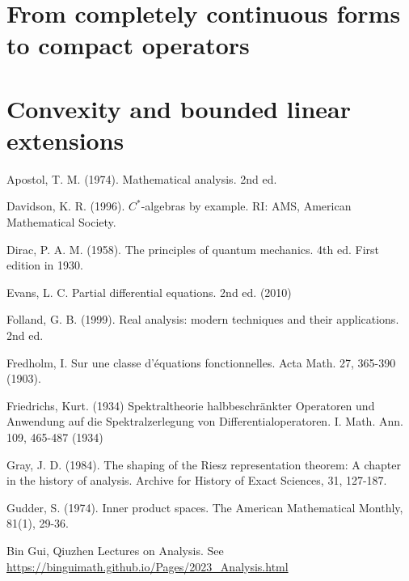 \documentclass[12pt,b5paper,notitlepage]{article}
\theoremstyle{definition}
\theoremstyle{plain}
\numberwithin{equation}{section}
\begin{document}
\section{From completely continuous forms to compact operators}\label{lb355}


\newpage

\section{Convexity and bounded linear extensions}





\printindex	






	\begin{thebibliography}{999999}
		\footnotesize	

Apostol, T. M. (1974). Mathematical analysis. 2nd ed.

Davidson, K. R. (1996). $C^*$-algebras by example. RI: AMS, American Mathematical Society.


Dirac, P. A. M. (1958). The principles of quantum mechanics. 4th ed. First edition in 1930.

Evans, L. C. Partial differential equations. 2nd ed. (2010)


Folland, G. B. (1999). Real analysis: modern techniques and their applications. 2nd ed.

Fredholm, I. Sur une classe d'{\'e}quations fonctionnelles. Acta Math. 27, 365-390 (1903).

Friedrichs, Kurt. (1934) Spektraltheorie halbbeschr{\"a}nkter {Operatoren} und {Anwendung} auf die {Spektralzerlegung} von {Differentialoperatoren}. {I}. Math. Ann. 109, 465-487 (1934)


Gray, J. D. (1984). The shaping of the Riesz representation theorem: A chapter in the history of analysis. Archive for History of Exact Sciences, 31, 127-187.

Gudder, S. (1974). Inner product spaces. The American Mathematical Monthly, 81(1), 29-36.

Bin Gui, Qiuzhen Lectures on Analysis. See \url{https://binguimath.github.io/Pages/2023_Analysis.html}


\end{thebibliography}
\end{document}
